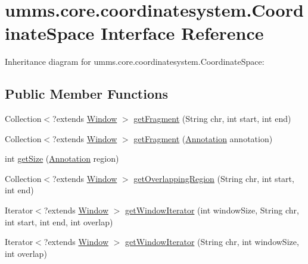 \hypertarget{interfaceumms_1_1core_1_1coordinatesystem_1_1_coordinate_space}{\section{umms.\+core.\+coordinatesystem.\+Coordinate\+Space Interface Reference}
\label{interfaceumms_1_1core_1_1coordinatesystem_1_1_coordinate_space}
}


Inheritance diagram for umms.\+core.\+coordinatesystem.\+Coordinate\+Space\+:
\subsection*{Public Member Functions}
\begin{DoxyCompactItemize}
\item 
Collection$<$?extends \hyperlink{interfaceumms_1_1core_1_1feature_1_1_window}{Window} $>$ \hyperlink{interfaceumms_1_1core_1_1coordinatesystem_1_1_coordinate_space_adebcb0b519d1c1d5d1b8bd23b9a7cad7}{get\+Fragment} (String chr, int start, int end)
\item 
Collection$<$?extends \hyperlink{interfaceumms_1_1core_1_1feature_1_1_window}{Window} $>$ \hyperlink{interfaceumms_1_1core_1_1coordinatesystem_1_1_coordinate_space_a0a6a644c7ebdfb80fa516d9c76a02a68}{get\+Fragment} (\hyperlink{interfaceumms_1_1core_1_1annotation_1_1_annotation}{Annotation} annotation)
\item 
int \hyperlink{interfaceumms_1_1core_1_1coordinatesystem_1_1_coordinate_space_ab4c7b2a5fb8675ccf6e43e4fa7e0a7a7}{get\+Size} (\hyperlink{interfaceumms_1_1core_1_1annotation_1_1_annotation}{Annotation} region)
\item 
Collection$<$?extends \hyperlink{interfaceumms_1_1core_1_1feature_1_1_window}{Window} $>$ \hyperlink{interfaceumms_1_1core_1_1coordinatesystem_1_1_coordinate_space_a41c8790447f098e8a88c44f8dd5c3b80}{get\+Overlapping\+Region} (String chr, int start, int end)
\item 
Iterator$<$?extends \hyperlink{interfaceumms_1_1core_1_1feature_1_1_window}{Window} $>$ \hyperlink{interfaceumms_1_1core_1_1coordinatesystem_1_1_coordinate_space_aa49b2170d4697219b7974ba20a0cf2fa}{get\+Window\+Iterator} (int window\+Size, String chr, int start, int end, int overlap)
\item 
Iterator$<$?extends \hyperlink{interfaceumms_1_1core_1_1feature_1_1_window}{Window} $>$ \hyperlink{interfaceumms_1_1core_1_1coordinatesystem_1_1_coordinate_space_a251edfa76046cde3077b86a670ac6945}{get\+Window\+Iterator} (String chr, int window\+Size, int overlap)

\end{DoxyCompactItemize}
